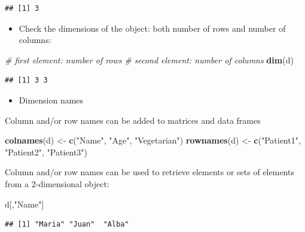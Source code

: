 \documentclass[]{book}
\newenvironment{Shaded}{\begin{snugshade}}{\end{snugshade}}
\newcommand{\CommentTok}[1]{\textcolor[rgb]{0.56,0.35,0.01}{\textit{#1}}}
\newcommand{\KeywordTok}[1]{\textcolor[rgb]{0.13,0.29,0.53}{\textbf{#1}}}
\newcommand{\NormalTok}[1]{#1}
\newcommand{\StringTok}[1]{\textcolor[rgb]{0.31,0.60,0.02}{#1}}
\providecommand{\tightlist}{%
  \setlength{\itemsep}{0pt}\setlength{\parskip}{0pt}}
\begin{document}
\begin{verbatim}
## [1] 3
\end{verbatim}

\begin{itemize}
\tightlist
\item
  Check the dimensions of the object: both number of rows and number of columns:
\end{itemize}

\begin{Shaded}
\begin{Highlighting}[]
\CommentTok{# first element: number of rows}
\CommentTok{# second element: number of columns}
\KeywordTok{dim}\NormalTok{(d)}
\end{Highlighting}
\end{Shaded}

\begin{verbatim}
## [1] 3 3
\end{verbatim}

\begin{itemize}
\tightlist
\item
  Dimension names
\end{itemize}

Column and/or row names can be added to matrices and data frames

\begin{Shaded}
\begin{Highlighting}[]
\KeywordTok{colnames}\NormalTok{(d) <-}\StringTok{ }\KeywordTok{c}\NormalTok{(}\StringTok{"Name"}\NormalTok{, }\StringTok{"Age"}\NormalTok{, }\StringTok{"Vegetarian"}\NormalTok{)}
\KeywordTok{rownames}\NormalTok{(d) <-}\StringTok{ }\KeywordTok{c}\NormalTok{(}\StringTok{"Patient1"}\NormalTok{, }\StringTok{"Patient2"}\NormalTok{, }\StringTok{"Patient3"}\NormalTok{)}
\end{Highlighting}
\end{Shaded}

Column and/or row names can be used to retrieve elements or sets of elements from a 2-dimensional object:

\begin{Shaded}
\begin{Highlighting}[]
\NormalTok{d[,}\StringTok{"Name"}\NormalTok{]}
\end{Highlighting}
\end{Shaded}

\begin{verbatim}
## [1] "Maria" "Juan"  "Alba"
\end{verbatim}
\end{document}
